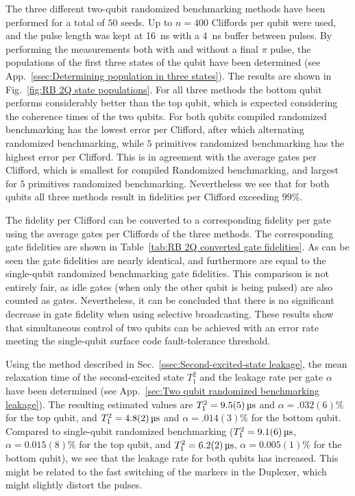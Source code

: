           The three different two-qubit randomized benchmarking methods have been performed for a total of $50$ seeds. Up to $n=400$ Cliffords per qubit were used, and the pulse length was kept at \SI{16}{\nano \second} with a \SI{4}{\nano \second} buffer between pulses. By performing the measurements both with and without a final $\pi$ pulse, the populations of the first three states of the qubit have been determined (see App.~\ref{ssec:Determining population in three states}). The results are shown in Fig.~\ref{fig:RB 2Q state populations}. For all three methods the bottom qubit performs considerably better than the top qubit, which is expected considering the coherence times of the two qubits. For both qubits compiled randomized benchmarking has the lowest error per Clifford, after which alternating randomized benchmarking, while $5$ primitives randomized benchmarking has the highest error per Clifford. This is in agreement with the average gates per Clifford, which is smallest for compiled Randomized benchmarking, and largest for $5$ primitives randomized benchmarking. Nevertheless we see that for both qubits all three methods result in fidelities per Clifford exceeding $99\%$.

          The fidelity per Clifford can be converted to a corresponding fidelity per gate using the average gates per Cliffords of the three methods. The corresponding gate fidelities are shown in Table~\ref{tab:RB 2Q converted gate fidelities}. As can be seen the gate fidelities are nearly identical, and furthermore are equal to the single-qubit randomized benchmarking gate fidelities. This comparison is not entirely fair, as idle gates (when only the other qubit is being pulsed) are also counted as gates. Nevertheless, it can be concluded that there is no significant decrease in gate fidelity when using selective broadcasting. These results show that simultaneous control of two qubits can be achieved with an error rate meeting the single-qubit surface code fault-tolerance threshold.

          Using the method described in Sec.~\ref{ssec:Second-excited-state leakage}, the mean relaxation time of the second-excited state $T_1^2$ and the leakage rate per gate $\alpha$ have been determined (see App.~\ref{sec:Two qubit randomized benchmarking leakage}). The resulting estimated values are $T_1^2=\SIm{9.5(5)}{\micro \second}$ and $\alpha=.032(6)\%$ for the top qubit, and $T_1^2=\SIm{4.8(2)}{\micro \second}$ and $\alpha=.014(3)\%$ for the bottom qubit. Compared to single-qubit randomized benchmarking ($T_1^2=\SIm{9.1(6)}{\micro \second}$, $\alpha=0.015(8)\%$ for the top qubit, and $T_1^2=\SIm{6.2(2)}{\micro \second}$, $\alpha=0.005(1)\%$ for the bottom qubit), we see that the leakage rate for both qubits has increased. This might be related to the fast switching of the markers in the Duplexer, which might slightly distort the pulses.

